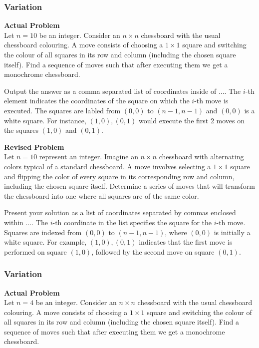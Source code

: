\subsubsection{Variation}
\textbf{Actual Problem}\\
Let $n = 10$ be an integer. Consider an $n \times n$ chessboard with the usual chessboard colouring. A move consists of choosing a $1 \times 1$ square and switching the colour of all squares in its row and column (including the chosen square itself). Find a sequence of moves such that after executing them we get a monochrome chessboard.

Output the answer as a comma separated list of coordinates inside of $\boxed{...}$. The $i$-th element indicates the coordinates of the square on which the $i$-th move is executed. The squares are labled from $(0,0)$ to $(n-1,n-1)$ and $(0,0)$ is a white square. For instance, $\boxed{(1,0),(0,1)}$ would execute the first 2 moves on the squares $(1,0)$ and $(0,1)$.

\textbf{Revised Problem}\\
Let $n = 10$ represent an integer. Imagine an $n \times n$ chessboard with alternating colors typical of a standard chessboard. A move involves selecting a $1 \times 1$ square and flipping the color of every square in its corresponding row and column, including the chosen square itself. Determine a series of moves that will transform the chessboard into one where all squares are of the same color.

Present your solution as a list of coordinates separated by commas enclosed within $\boxed{...}$. The $i$-th coordinate in the list specifies the square for the $i$-th move. Squares are indexed from $(0,0)$ to $(n-1,n-1)$, where $(0,0)$ is initially a white square. For example, $\boxed{(1,0),(0,1)}$ indicates that the first move is performed on square $(1,0)$, followed by the second move on square $(0,1)$.

\subsubsection{Variation}
\textbf{Actual Problem}\\
Let $n = 4$ be an integer. Consider an $n \times n$ chessboard with the usual chessboard colouring. A move consists of choosing a $1 \times 1$ square and switching the colour of all squares in its row and column (including the chosen square itself). Find a sequence of moves such that after executing them we get a monochrome chessboard.

